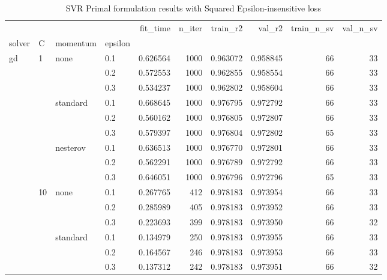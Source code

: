 \begin{table}[H]
\centering
\caption{SVR Primal formulation results with Squared Epsilon-insensitive loss}
\label{primal_svr_squared_eps_cv_results}
\begin{tabular}{llllrrrrrr}
\toprule
          &     &   &     &  fit\_time &  n\_iter &  train\_r2 &    val\_r2 &  train\_n\_sv &  val\_n\_sv \\
solver & C & momentum & epsilon &           &         &           &           &             &           \\
\midrule
gd & 1   & none & 0.1 &  0.626564 &    1000 &  0.963072 &  0.958845 &          66 &        33 \\
          &     &   & 0.2 &  0.572553 &    1000 &  0.962855 &  0.958554 &          66 &        33 \\
          &     &   & 0.3 &  0.534237 &    1000 &  0.962802 &  0.958604 &          66 &        33 \\
          &     & standard & 0.1 &  0.668645 &    1000 &  0.976795 &  0.972792 &          66 &        33 \\
          &     &   & 0.2 &  0.560162 &    1000 &  0.976805 &  0.972807 &          66 &        33 \\
          &     &   & 0.3 &  0.579397 &    1000 &  0.976804 &  0.972802 &          65 &        33 \\
          &     & nesterov & 0.1 &  0.636513 &    1000 &  0.976770 &  0.972801 &          66 &        33 \\
          &     &   & 0.2 &  0.562291 &    1000 &  0.976789 &  0.972792 &          66 &        33 \\
          &     &   & 0.3 &  0.646051 &    1000 &  0.976796 &  0.972796 &          65 &        33 \\
          & 10  & none & 0.1 &  0.267765 &     412 &  0.978183 &  0.973954 &          66 &        33 \\
          &     &   & 0.2 &  0.285989 &     405 &  0.978183 &  0.973952 &          66 &        33 \\
          &     &   & 0.3 &  0.223693 &     399 &  0.978183 &  0.973950 &          66 &        32 \\
          &     & standard & 0.1 &  0.134979 &     250 &  0.978183 &  0.973955 &          66 &        33 \\
          &     &   & 0.2 &  0.164567 &     246 &  0.978183 &  0.973953 &          66 &        33 \\
          &     &   & 0.3 &  0.137312 &     242 &  0.978183 &  0.973951 &          66 &        32 \\

\end{tabular}
\end{table}

